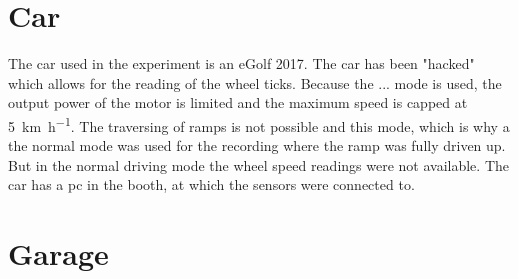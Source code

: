 \section{Car}
The car used in the experiment is an eGolf 2017. 
The car has been "hacked" which allows for the reading of the wheel ticks.
Because the ... mode is used, the output power of the motor is limited and the maximum speed is capped at \SI{5}{\kilo\metre\per\hour}.
The traversing of ramps is not possible and this mode, which is why a the normal mode was used for the recording where the ramp was fully driven up.
But in the normal driving mode the wheel speed readings were not available. 
The car has a pc in the booth, at which the sensors were connected to. 



\section{Garage}

